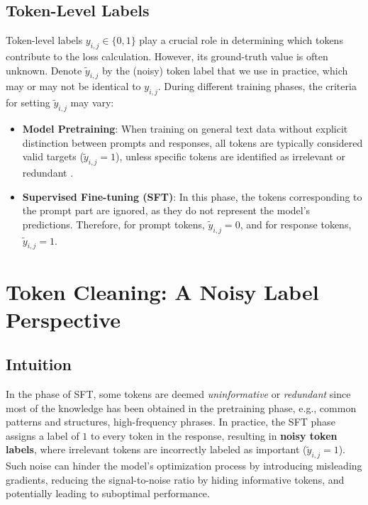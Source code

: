 \subsection{Token-Level Labels}
Token-level labels $ y_{i,j} \in \{0, 1\} $ play a crucial role in determining which tokens contribute to the loss calculation. However, its ground-truth value is often unknown. Denote $\tilde y_{i,j}$ by the (noisy) token label that we use in practice, which may or may not be identical to $y_{i,j}$. During different training phases, the criteria for setting $\tilde y_{i,j} $ may vary:
\begin{itemize}[left=-5pt]
    \item \textbf{Model Pretraining}: When training on general text data without explicit distinction between prompts and responses, all tokens are typically considered valid targets ($ \tilde y_{i,j} = 1 $), unless specific tokens are identified as irrelevant or redundant \citep{linnot}.
    \item \textbf{Supervised Fine-tuning (SFT)}: In this phase, the tokens corresponding to the prompt part are ignored, as they do not represent the model's predictions. Therefore, for prompt tokens, $\tilde y_{i,j} = 0 $, and for response tokens, $\tilde y_{i,j} = 1 $.
\end{itemize}





\section{Token Cleaning: A Noisy Label Perspective}\label{sec:method}

\subsection{Intuition}

In the phase of SFT, some tokens are deemed \textit{uninformative} or \textit{redundant} since most of the knowledge has been obtained in the pretraining phase, e.g., common patterns and structures, high-frequency phrases. In practice, the SFT phase assigns a label of $1$ to every token in the response, resulting in \textbf{noisy token labels}, where irrelevant tokens are incorrectly labeled as important (\( \tilde y_{i,j} = 1 \)). Such noise can hinder the model’s optimization process by introducing misleading gradients, reducing the signal-to-noise ratio by hiding informative tokens, and potentially leading to suboptimal performance.

